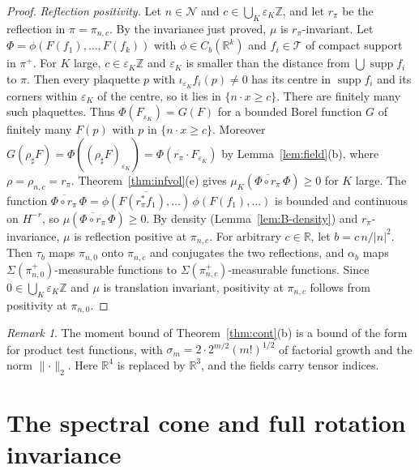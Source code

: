 \documentclass[11pt]{amsart}
\theoremstyle{plain}
\theoremstyle{definition}
\theoremstyle{remark}
\newtheorem{remark}[theorem]{Remark}
\numberwithin{equation}{section}
\newcommand{\R}{\mathbb{R}}
\newcommand{\Z}{\mathbb{Z}}
\newcommand{\eps}{\varepsilon}
\newcommand{\cN}{\mathcal{N}}
\newcommand{\cT}{\mathcal{T}}
\newcommand{\abs}[1]{\lvert #1\rvert}
\newcommand{\norm}[1]{\lVert #1\rVert}
\DeclareMathOperator{\supp}{supp}
\begin{document}
\begin{proof}
\emph{Reflection positivity.} Let $n\in\cN$ and $c\in\bigcup_K\eps_K\Z$, and let $r_\pi$ be the reflection in $\pi=\pi_{n,c}$. By the invariance just proved, $\mu$ is $r_\pi$-invariant. Let $\Phi=\phi(F(f_1),\dots,F(f_k))$ with $\phi\in C_b(\R^k)$ and $f_i\in\cT$ of compact support in $\pi^+$. For $K$ large, $c\in\eps_K\Z$ and $\eps_K$ is smaller than the distance from $\bigcup\supp f_i$ to $\pi$. Then every plaquette $p$ with $\iota_{\eps_K}f_i(p)\ne0$ has its centre in $\supp f_i$ and its corners within $\eps_K$ of the centre, so it lies in $\{n\cdot x\ge c\}$. There are finitely many such plaquettes. Thus $\Phi(F_{\eps_K})=G(F)$ for a bounded Borel function $G$ of finitely many $F(p)$ with $p$ in $\{n\cdot x\ge c\}$. Moreover $G(\rho_\sharp F)=\Phi((\rho_\sharp F)_{\eps_K})=\Phi(r_\pi\cdot F_{\eps_K})$ by Lemma~\ref{lem:field}(b), where $\rho=\rho_{n,c}=r_\pi$. Theorem~\ref{thm:infvol}(e) gives $\mu_K(\overline{\Phi\circ r_\pi}\,\Phi)\ge0$ for $K$ large. The function $\overline{\Phi\circ r_\pi}\,\Phi=\overline{\phi(F(r_\pi^*f_1),\dots)}\,\phi(F(f_1),\dots)$ is bounded and continuous on $H^{-r}$, so $\mu(\overline{\Phi\circ r_\pi}\,\Phi)\ge0$. By density (Lemma~\ref{lem:B-density}) and $r_\pi$-invariance, $\mu$ is reflection positive at $\pi_{n,c}$. For arbitrary $c\in\R$, let $b=c\,n/\abs n^2$. Then $\tau_b$ maps $\pi_{n,0}$ onto $\pi_{n,c}$ and conjugates the two reflections, and $\alpha_b$ maps $\Sigma(\pi^+_{n,0})$-measurable functions to $\Sigma(\pi^+_{n,c})$-measurable functions. Since $0\in\bigcup_K\eps_K\Z$ and $\mu$ is translation invariant, positivity at $\pi_{n,c}$ follows from positivity at $\pi_{n,0}$.
\end{proof}

\begin{remark}\label{rem:OS0}
The moment bound of Theorem~\ref{thm:cont}(b) is a bound of the form \cite[(E0''), (4.2), p.~287]{OS75} for product test functions, with $\sigma_m=2\cdot2^{m/2}(m!)^{1/2}$ of factorial growth and the norm $\norm\cdot_2$. Here $\R^4$ is replaced by $\R^3$, and the fields carry tensor indices.
\end{remark}

\section{The spectral cone and full rotation invariance}\label{sec:rot}
\end{document}
